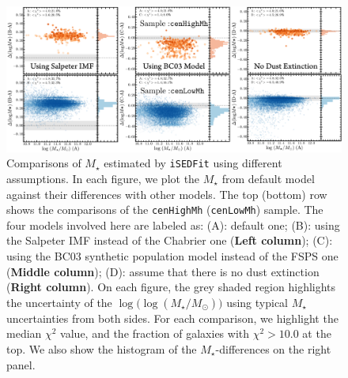 \documentclass{emulateapj}
\def\rbcg{\texttt{cenHighMh}}
\def\nbcg{\texttt{cenLowMh}}
\def\mstar{{$M_{\star}$}}
\def\logms{{$\log (M_{\star}/M_{\odot})$}}
\begin{document}
\begin{CJK*}{UTF8}{gbsn}
    \begin{figure}[hbt!]
        \begin{center}
        \includegraphics[width=\textwidth]{fig/redbcg_isedfit_3.pdf}
        \caption{
            Comparisons of \mstar{} estimated by \texttt{iSEDFit} using different
            assumptions. 
            In each figure, we plot the \mstar{} from default model against their 
            differences with other models. 
            The top (bottom) row shows the comparisons of the \rbcg{} (\nbcg{}) sample. 
            The four models involved here are labeled as: 
            (A): default one; 
            (B): using the Salpeter IMF instead of the Chabrier one 
                (\textbf{Left column});
            (C): using the BC03 synthetic population model instead of the FSPS one
                (\textbf{Middle column});
            (D): assume that there is no dust extinction (\textbf{Right column}). 
            On each figure, the grey shaded region highlights the uncertainty 
            of the $\log($\logms{}$)$ using typical \mstar{} uncertainties from 
            both sides. 
            For each comparison, we highlight the median $\chi^{2}$ value, and the fraction
            of galaxies with $\chi^{2} > 10.0$ at the top. 
            We also show the histogram of the \mstar{}-differences on the right panel.
            }
        \label{fig:ised_3}
        \end{center}
    \end{figure}

 

\end{CJK*}
\end{document}
